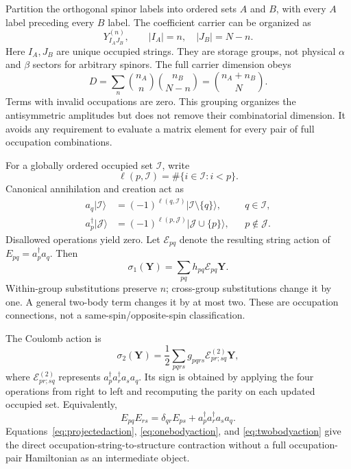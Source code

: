 \documentclass[12pt]{article}
\begin{document}
Partition the orthogonal spinor labels into ordered sets \(A\) and \(B\), with every \(A\) label preceding every \(B\) label. The coefficient carrier can be organized as
\begin{equation}
 Y^{(n)}_{I_AJ_B},\qquad |I_A|=n,\quad |J_B|=N-n.
 \label{eq:stringcarrier}
\end{equation}
Here \(I_A,J_B\) are unique occupied strings. They are storage groups, not physical \(\alpha\) and \(\beta\) sectors for arbitrary spinors. The full carrier dimension obeys
\begin{equation}
 D=\sum_n\binom{n_A}{n}\binom{n_B}{N-n}
  =\binom{n_A+n_B}{N}.
 \label{eq:carrierdimension}
\end{equation}
Terms with invalid occupations are zero. This grouping organizes the antisymmetric amplitudes but does not remove their combinatorial dimension. It avoids any requirement to evaluate a matrix element for every pair of full occupation combinations.

For a globally ordered occupied set \(\mathcal I\), write
\begin{equation}
 \ell(p,\mathcal I)=\#\{i\in\mathcal I:i<p\}.
 \label{eq:paritycount}
\end{equation}
Canonical annihilation and creation act as
\begin{equation}
 \begin{aligned}
 a_q|\mathcal I\rangle
 &=(-1)^{\ell(q,\mathcal I)}|\mathcal I\setminus\{q\}\rangle,
 &&q\in\mathcal I,\\
 a_p^\dagger|\mathcal J\rangle
 &=(-1)^{\ell(p,\mathcal J)}|\mathcal J\cup\{p\}\rangle,
 &&p\notin\mathcal J.
 \end{aligned}
 \label{eq:stringsigns}
\end{equation}
Disallowed operations yield zero. Let \(\mathcal E_{pq}\) denote the resulting string action of \(E_{pq}=a_p^\dagger a_q\). Then
\begin{equation}
 \sigma_1(\mathbf Y)=\sum_{pq}h_{pq}\mathcal E_{pq}\mathbf Y.
 \label{eq:onebodyaction}
\end{equation}
Within-group substitutions preserve \(n\); cross-group substitutions change it by one. A general two-body term changes it by at most two. These are occupation connections, not a same-spin/opposite-spin classification.

The Coulomb action is
\begin{equation}
 \sigma_2(\mathbf Y)=\frac12\sum_{pqrs}g_{pqrs}
       \mathcal E^{(2)}_{pr;sq}\mathbf Y,
 \label{eq:twobodyaction}
\end{equation}
where \(\mathcal E^{(2)}_{pr;sq}\) represents \(a_p^\dagger a_r^\dagger a_s a_q\). Its sign is obtained by applying the four operations from right to left and recomputing the parity on each updated occupied set. Equivalently,
\begin{equation}
 E_{pq}E_{rs}=\delta_{qr}E_{ps}
              +a_p^\dagger a_r^\dagger a_s a_q.
 \label{eq:normalordering}
\end{equation}
Equations~\eqref{eq:projectedaction}, \eqref{eq:onebodyaction}, and \eqref{eq:twobodyaction} give the direct occupation-string-to-structure contraction without a full occupation-pair Hamiltonian as an intermediate object.
\end{document}
